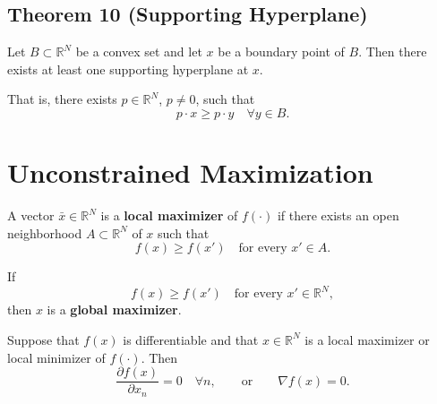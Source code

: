 \begin{tcolorbox}[breakable, colback=white]

\subsection*{Theorem 10 (Supporting Hyperplane)}

Let $B \subset \mathbb{R}^N$ be a convex set and let $x$ be a boundary point of $B$.
Then there exists at least one supporting hyperplane at $x$.

That is, there exists $p \in \mathbb{R}^N$, $p \ne 0$, such that
\[
p \cdot x \ge p \cdot y
\quad \forall y \in B.
\]


\end{tcolorbox}


\section{Unconstrained Maximization}

A vector $\bar x \in \mathbb{R}^N$ is a \textbf{local maximizer} of $f(\cdot)$
if there exists an open neighborhood $A \subset \mathbb{R}^N$ of $x$ such that
\[
f(x) \ge f(x') \quad \text{for every } x' \in A.
\]

If
\[
f(x) \ge f(x') \quad \text{for every } x' \in \mathbb{R}^N,
\]
then $x$ is a \textbf{global maximizer}.

\medskip

Suppose that $f(x)$ is differentiable and that $x \in \mathbb{R}^N$
is a local maximizer or local minimizer of $f(\cdot)$. Then
\[
\frac{\partial f(x)}{\partial x_n} = 0 \quad \forall n,
\qquad \text{or} \qquad
\nabla f(x) = 0.
\]

